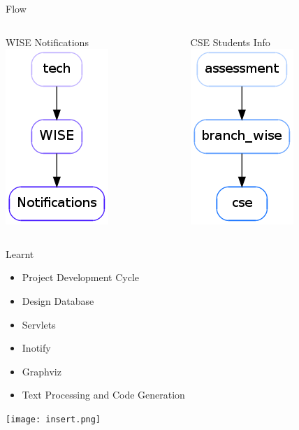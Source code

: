 \documentclass[14pt]{beamer}
\begin{document}
\begin{frame}{Flow}
\begin{columns}[T]
		\begin{column}{.5\textwidth}
		\begin{center}
			WISE Notifications
			\includegraphics[scale = 0.5]{flow.png}
			\end{center}
		\end{column}
		\begin{column}{.5\textwidth}
		\begin{center}
			CSE Students Info
			\includegraphics[scale = 0.5]{flow2.png}
			\end{center}
		\end{column}
	\end{columns} 
\end{frame}

\begin{frame}{Learnt}
	\begin{itemize}
		\item Project Development Cycle
		\item Design Database
		\item Servlets
		\item Inotify
		\item Graphviz
		\item Text Processing and Code Generation
	\end{itemize}
	\begin{center}
		\texttt{[image: insert.png]}
	\end{center}
\end{frame}
\end{document}

